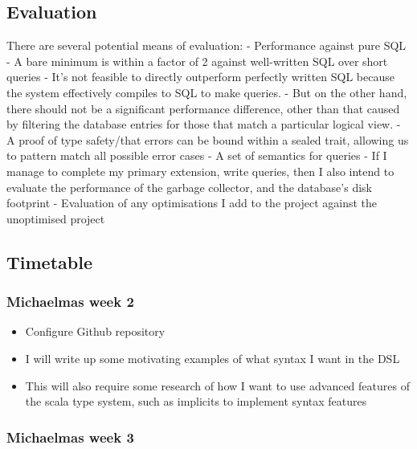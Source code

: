\documentclass[12pt,a4paper,twoside,openright]{report}
\providecommand{\tightlist}{%
  \setlength{\itemsep}{0pt}\setlength{\parskip}{0pt}}
\begin{document}
\hypertarget{evaluation}{%
\subsection{Evaluation}\label{evaluation}}

There are several potential means of evaluation: - Performance against
pure SQL - A bare minimum is within a factor of 2 against well-written
SQL over short queries - It's not feasible to directly outperform
perfectly written SQL because the system effectively compiles to SQL to
make queries. - But on the other hand, there should not be a significant
performance difference, other than that caused by filtering the database
entries for those that match a particular logical view. - A proof of
type safety/that errors can be bound within a sealed trait, allowing us
to pattern match all possible error cases - A set of semantics for
queries - If I manage to complete my primary extension, write queries,
then I also intend to evaluate the performance of the garbage collector,
and the database's disk footprint - Evaluation of any optimisations I
add to the project against the unoptimised project

\hypertarget{timetable}{%
\subsection{Timetable}\label{timetable}}

\hypertarget{michaelmas-week-2}{%
\subsubsection{Michaelmas week 2}\label{michaelmas-week-2}}

\begin{itemize}
\tightlist
\item
  Configure Github repository
\item
  I will write up some motivating examples of what syntax I want in the
  DSL
\item
  This will also require some research of how I want to use advanced
  features of the scala type system, such as implicits to implement
  syntax features
\end{itemize}

\hypertarget{michaelmas-week-3}{%
\subsubsection{Michaelmas week 3}\label{michaelmas-week-3}}
\end{document}
